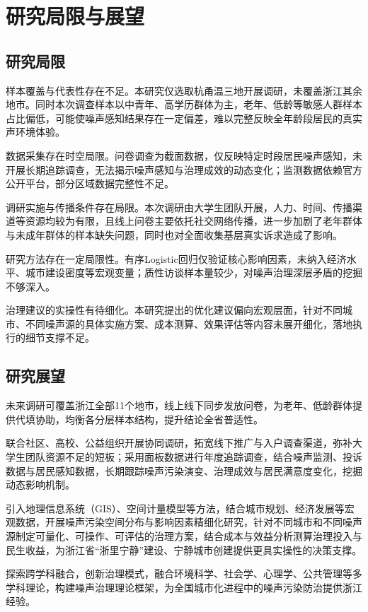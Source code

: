\section{研究局限与展望}

\subsection{研究局限}

样本覆盖与代表性存在不足。本研究仅选取杭甬温三地开展调研，未覆盖浙江其余地市。同时本次调查样本以中青年、高学历群体为主，老年、低龄等敏感人群样本占比偏低，可能使噪声感知结果存在一定偏差，难以完整反映全年龄段居民的真实声环境体验。

数据采集存在时空局限。问卷调查为截面数据，仅反映特定时段居民噪声感知，未开展长期追踪调查，无法揭示噪声感知与治理成效的动态变化；监测数据依赖官方公开平台，部分区域数据完整性不足。

调研实施与传播条件存在局限。本次调研由大学生团队开展，人力、时间、传播渠道等资源均较为有限，且线上问卷主要依托社交网络传播，进一步加剧了老年群体与未成年群体的样本缺失问题，同时也对全面收集基层真实诉求造成了影响。

研究方法存在一定局限性。有序Logistic回归仅验证核心影响因素，未纳入经济水平、城市建设密度等宏观变量；质性访谈样本量较少，对噪声治理深层矛盾的挖掘不够深入。

治理建议的实操性有待细化。本研究提出的优化建议偏向宏观层面，针对不同城市、不同噪声源的具体实施方案、成本测算、效果评估等内容未展开细化，落地执行的细节支撑不足。

\subsection{研究展望}

未来调研可覆盖浙江全部11个地市，线上线下同步发放问卷，为老年、低龄群体提供代填协助，均衡各分层样本结构，提升结论全省普适性。

联合社区、高校、公益组织开展协同调研，拓宽线下推广与入户调查渠道，弥补大学生团队资源不足的短板；采用面板数据进行年度追踪调查，结合噪声监测、投诉数据与居民感知数据，长期跟踪噪声污染演变、治理成效与居民满意度变化，挖掘动态影响机制。

引入地理信息系统（GIS）、空间计量模型等方法，结合城市规划、经济发展等宏观数据，开展噪声污染空间分布与影响因素精细化研究，针对不同城市和不同噪声源制定可量化、可操作、可评估的治理方案，结合成本与效益分析测算治理投入与民生收益，为浙江省“浙里宁静”建设、宁静城市创建提供更具实操性的决策支撑。

探索跨学科融合，创新治理模式，融合环境科学、社会学、心理学、公共管理等多学科理论，构建噪声治理理论框架，为全国城市化进程中的噪声污染防治提供浙江经验。

